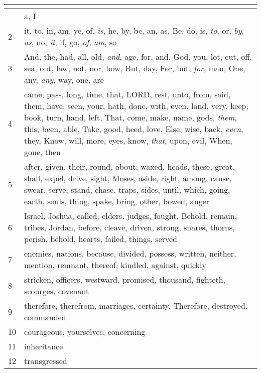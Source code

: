 \begin{center}
\begin{longtable}{l|p{3.75in}}
\hline \multicolumn{2}{c}{{ }} \\ \hline
\endfoot 
1 & a, I\\ \hline 
2 & it, to, in, am, ye, of, \emph{is}, he, by, be, an, as, Be, do, is, \emph{to}, or, \emph{by}, \emph{as}, no, \emph{it}, if, go, \emph{of}, \emph{am}, so\\ \hline 
3 & And, the, had, all, old, \emph{and}, age, for, and, God, you, lot, cut, off, sea, out, law, not, nor, bow, But, day, For, but, \emph{for}, man, One, any, \emph{any}, way, one, are\\ \hline 
4 & came, pass, long, time, that, LORD, rest, unto, from, said, them, have, seen, your, hath, done, with, even, land, very, keep, book, turn, hand, left, That, come, make, name, gods, \emph{them}, this, been, able, Take, good, heed, love, Else, wise, back, \emph{even}, they, Know, will, more, eyes, know, \emph{that}, upon, evil, When, gone, then\\ \hline 
5 & after, given, their, round, about, waxed, heads, these, great, shall, expel, drive, sight, Moses, aside, right, among, cause, swear, serve, stand, chase, traps, sides, until, which, going, earth, souls, thing, spake, bring, other, bowed, anger\\ \hline 
6 & Israel, Joshua, called, elders, judges, fought, Behold, remain, tribes, Jordan, before, cleave, driven, strong, snares, thorns, perish, behold, hearts, failed, things, served\\ \hline 
7 & enemies, nations, because, divided, possess, written, neither, mention, remnant, thereof, kindled, against, quickly\\ \hline 
8 & stricken, officers, westward, promised, thousand, fighteth, scourges, covenant\\ \hline 
9 & therefore, therefrom, marriages, certainty, Therefore, destroyed, commanded\\ \hline 
10 & courageous, yourselves, concerning\\ \hline 
11 & inheritance\\ \hline 
12 & transgressed\\ \hline 
\end{longtable}
\end{center}





